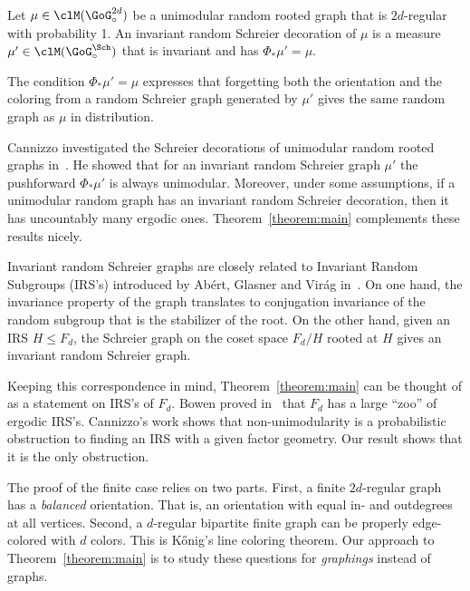\begin{defi}\label{definition:invariant_schreierization}
Let $\mu \in \clM(\GoG_{\circ}^{2d})$ be a unimodular random rooted graph that is $2d$-regular with probability 1. An invariant random Schreier decoration of $\mu$ is a measure $\mu' \in \clM(\GoG_{\circ}^{\Sch})$ that is invariant and has $\Phi_{*} \mu' = \mu$.
\end{defi}
\noindent The condition $\Phi_{*} \mu' = \mu$ expresses that forgetting both the orientation and the coloring from a random Schreier graph generated by $\mu'$ gives the same random graph as $\mu$ in distribution.



Cannizzo investigated the Schreier decorations of unimodular random rooted graphs in~\cite{cannizzo2013invariant}. He showed that for an invariant random Schreier graph $\mu'$ the pushforward $\Phi_{*} \mu'$ is always unimodular. Moreover, under some assumptions, if a unimodular random graph has an invariant random Schreier decoration, then it has uncountably many ergodic ones. Theorem~\ref{theorem:main} complements these results nicely.

Invariant random Schreier graphs are closely related to Invariant Random Subgroups (IRS's) introduced by Abért, Glasner and Virág in~\cite{abert2014kesten}. On one hand, the invariance property of the graph translates to conjugation invariance of the random subgroup that is the stabilizer of the root. On the other hand, given an IRS $H \leq F_d$, the Schreier graph on the coset space $F_d/H$ rooted at $H$ gives an invariant random Schreier graph.

Keeping this correspondence in mind, Theorem~\ref{theorem:main} can be thought of as a statement on IRS's of $F_d$. Bowen proved in~\cite{bowen2012invariant} that $F_d$ has a large ``zoo'' of ergodic IRS's. Cannizzo's work shows that non-unimodularity is a probabilistic obstruction to finding an IRS with a given factor geometry. Our result shows that it is the only obstruction.

The proof of the finite case relies on two parts. First, a finite $2d$-regular graph has a \emph{balanced} orientation. That is, an orientation with equal in- and outdegrees at all vertices. Second, a $d$-regular bipartite finite graph can be properly edge-colored with $d$ colors. This is K{\H o}nig's line coloring theorem. Our approach to Theorem~\ref{theorem:main} is to study these questions for \emph{graphings} instead of graphs.

